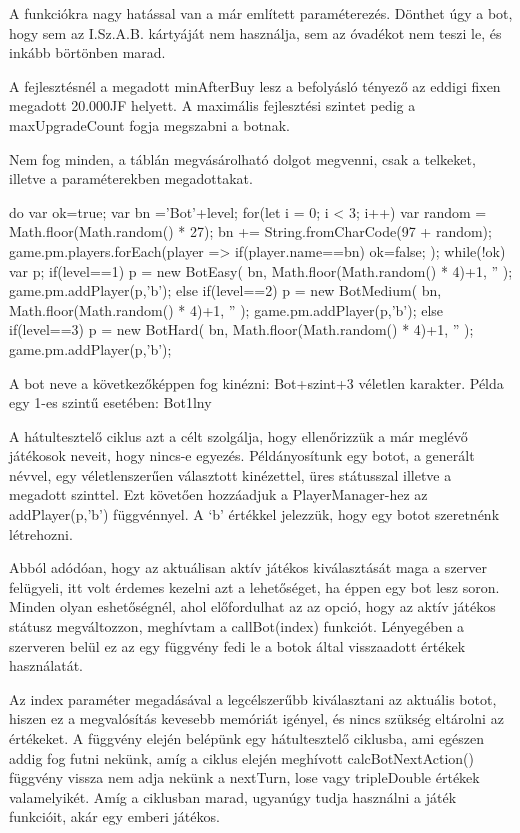 A funkciókra nagy hatással van a már említett paraméterezés. Dönthet úgy a bot, hogy sem az I.Sz.A.B. kártyáját nem használja, sem az óvadékot nem teszi le, és inkább börtönben marad.

	A fejlesztésnél a megadott minAfterBuy lesz a befolyásló tényező az eddigi fixen megadott 20.000JF helyett. A maximális fejlesztési szintet pedig a maxUpgradeCount fogja megszabni a botnak.

	Nem fog minden, a táblán megvásárolható dolgot megvenni, csak a telkeket, illetve a paraméterekben megadottakat.


\begin{javascript}
do{
        var ok=true;
        var bn ='Bot'+level;
        for(let i = 0; i < 3; i++){
            var random = Math.floor(Math.random() * 27);
            bn += String.fromCharCode(97 + random);
        }
        game.pm.players.forEach(player => {
            if(player.name==bn){
                ok=false;
            }
        });
    }while(!ok)
    var p;
    if(level==1){
        p = new BotEasy(
            bn,
            Math.floor(Math.random() * 4)+1,
            ''
        );
        game.pm.addPlayer(p,'b');
    }else if(level==2){
        p = new BotMedium(
            bn,
            Math.floor(Math.random() * 4)+1,
            ''
        );
        game.pm.addPlayer(p,'b');
    }else if(level==3){
        p = new BotHard(
            bn,
            Math.floor(Math.random() * 4)+1,
            ''
        );
        game.pm.addPlayer(p,'b');
}
\end{javascript}

A bot neve a következőképpen fog kinézni: Bot+szint+3 véletlen karakter. Példa egy 1-es szintű esetében: Bot1lny

A hátultesztelő ciklus azt a célt szolgálja, hogy ellenőrizzük a már meglévő játékosok neveit, hogy nincs-e egyezés. Példányosítunk egy botot, a generált névvel, egy véletlenszerűen választott kinézettel, üres státusszal illetve a megadott szinttel. Ezt követően hozzáadjuk a PlayerManager-hez az addPlayer(p,’b’) függvénnyel. A ‘b’ értékkel jelezzük, hogy egy botot szeretnénk létrehozni.


Abból adódóan, hogy az aktuálisan aktív játékos kiválasztását maga a szerver felügyeli, itt volt érdemes kezelni azt a lehetőséget, ha éppen egy bot lesz soron.  Minden olyan eshetőségnél, ahol előfordulhat az az opció, hogy az aktív játékos státusz megváltozzon, meghívtam a callBot(index) funkciót. Lényegében a szerveren belül ez az egy függvény fedi le a botok által visszaadott értékek használatát.


Az index paraméter megadásával a legcélszerűbb kiválasztani az aktuális botot, hiszen ez a megvalósítás kevesebb memóriát igényel, és nincs szükség eltárolni az értékeket. A függvény elején belépünk egy hátultesztelő ciklusba, ami egészen addig fog futni nekünk, amíg a ciklus elején meghívott calcBotNextAction() függvény vissza nem adja nekünk a nextTurn, lose vagy tripleDouble értékek valamelyikét. Amíg a ciklusban marad, ugyanúgy tudja használni a játék funkcióit, akár egy emberi játékos.